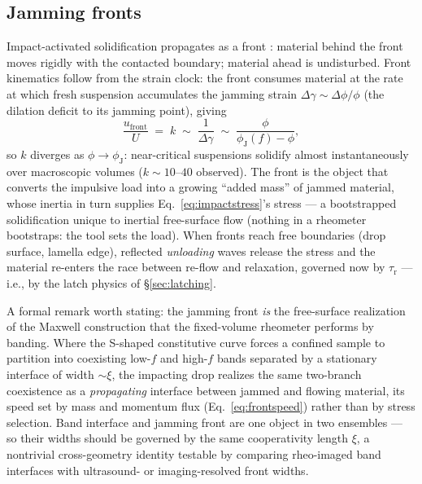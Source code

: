 \documentclass[11pt]{article}
\newcommand{\phiJ}{\phi_{\mathrm{J}}}
\begin{document}
\subsection{Jamming fronts}
\label{sec:fronts}
Impact-activated solidification propagates as a front \cite{waitukaitis2012,han2016,peters2016}: material behind the front moves rigidly with the contacted boundary; material ahead is undisturbed. Front kinematics follow from the strain clock: the front consumes material at the rate at which fresh suspension accumulates the jamming strain $\Delta\gamma \sim \Delta\phi/\phi$ (the dilation deficit to its jamming point), giving
\begin{equation}
\frac{u_{\mathrm{front}}}{U} \;=\; k \;\sim\; \frac{1}{\Delta\gamma} \;\sim\; \frac{\phi}{\phiJ(f)-\phi},
\label{eq:frontspeed}
\end{equation}
so $k$ diverges as $\phi \to \phiJ$: near-critical suspensions solidify almost instantaneously over macroscopic volumes ($k \sim 10$--$40$ observed). The front is the object that converts the impulsive load into a growing ``added mass'' of jammed material, whose inertia in turn supplies Eq.~\eqref{eq:impactstress}'s stress --- a bootstrapped solidification unique to inertial free-surface flow (nothing in a rheometer bootstraps: the tool sets the load). When fronts reach free boundaries (drop surface, lamella edge), reflected \emph{unloading} waves release the stress and the material re-enters the race between re-flow and relaxation, governed now by $\tau_{\mathrm{r}}$ --- i.e., by the latch physics of \S\ref{sec:latching}.

A formal remark worth stating: the jamming front \emph{is} the free-surface realization of the Maxwell construction that the fixed-volume rheometer performs by banding. Where the S-shaped constitutive curve forces a confined sample to partition into coexisting low-$f$ and high-$f$ bands separated by a stationary interface of width $\sim\xi$, the impacting drop realizes the same two-branch coexistence as a \emph{propagating} interface between jammed and flowing material, its speed set by mass and momentum flux (Eq.~\eqref{eq:frontspeed}) rather than by stress selection. Band interface and jamming front are one object in two ensembles --- so their widths should be governed by the same cooperativity length $\xi$, a nontrivial cross-geometry identity testable by comparing rheo-imaged band interfaces with ultrasound- or imaging-resolved front widths.
\end{document}
